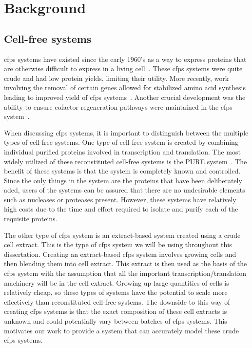 \chapter{Background}\label{chap:bkg}


\section{Cell-free systems}
\gls{cfps} systems have existed since the early 1960's as a way to express proteins that are otherwise difficult to express in a living cell~\cite{nirenberg1961dependence}.
These \gls{cfps} systems were quite crude and had low protein yields, limiting their utility.
More recently, work involving the removal of certain genes allowed for stabilized amino acid synthesis leading to improved yield of \gls{cfps} systems~\cite{calhoun2006total}.
Another crucial development was the ability to ensure cofactor regeneration pathways were maintained in the \gls{cfps} system~\cite{jewett2008integrated}.

When discussing \gls{cfps} systems, it is important to distinguish between the multiple types of cell-free systems.
One type of cell-free system is created by combining individual purified proteins involved in transcription and translation.
The most widely utilized of these reconstituted cell-free systems is the PURE system~\cite{shimizu2001cell}.
The benefit of these systems is that the system is completely known and controlled.
Since the only things in the system are the proteins that have been deliberately aded, users of the systems can be assured that there are no undesirable elements such as nucleases or proteases present.
However, these systems have relatively high costs due to the time and effort required to isolate and purify each of the requisite proteins.

The other type of \gls{cfps} system is an extract-based system created using a crude cell extract.
This is the type of \gls{cfps} system we will be using throughout this dissertation.
Creating an extract-based \gls{cfps} system involves growing cells and then blending them into cell extract.
This extract is then used as the basis of the \gls{cfps} system with the assumption that all the important transcription/translation machinery will be in the cell extract.
Growing up large quantities of cells is relatively cheap, so these types of systems have the potential to scale more effectively than reconstituted cell-free systems. 
The downside to this way of creating \gls{cfps} systems is that the exact composition of these cell extracts is unknown and could potentially vary between batches of \gls{cfps} systems.
This motivates our work to provide a system that can accurately model these crude \gls{cfps} systems.

